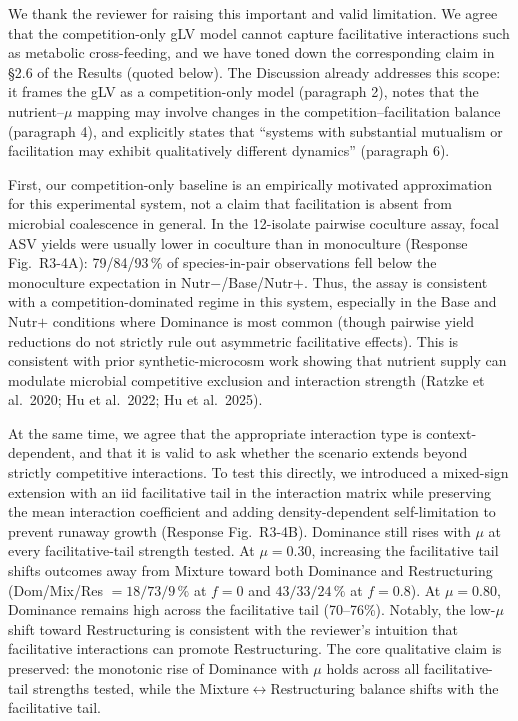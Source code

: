 \responselabel
We thank the reviewer for raising this important and valid limitation. We agree that the competition-only gLV model cannot capture facilitative interactions such as metabolic cross-feeding, and we have toned down the corresponding claim in \S2.6 of the Results (quoted below). The Discussion already addresses this scope: it frames the gLV as a competition-only model (paragraph 2), notes that the nutrient--$\mu$ mapping may involve changes in the competition--facilitation balance (paragraph 4), and explicitly states that ``systems with substantial mutualism or facilitation may exhibit qualitatively different dynamics'' (paragraph 6).

First, our competition-only baseline is an empirically motivated approximation for this experimental system, not a claim that facilitation is absent from microbial coalescence in general. In the 12-isolate pairwise coculture assay, focal ASV yields were usually lower in coculture than in monoculture (Response Fig.~R3-4A): 79/84/93\,\% of species-in-pair observations fell below the monoculture expectation in Nutr$-$/Base/Nutr$+$. Thus, the assay is consistent with a competition-dominated regime in this system, especially in the Base and Nutr$+$ conditions where Dominance is most common (though pairwise yield reductions do not strictly rule out asymmetric facilitative effects). This is consistent with prior synthetic-microcosm work showing that nutrient supply can modulate microbial competitive exclusion and interaction strength (Ratzke et al.\ 2020; Hu et al.\ 2022; Hu et al.\ 2025).

At the same time, we agree that the appropriate interaction type is context-dependent, and that it is valid to ask whether the scenario extends beyond strictly competitive interactions. To test this directly, we introduced a mixed-sign extension with an iid facilitative tail in the interaction matrix while preserving the mean interaction coefficient and adding density-dependent self-limitation to prevent runaway growth (Response Fig.~R3-4B). Dominance still rises with $\mu$ at every facilitative-tail strength tested. At $\mu=0.30$, increasing the facilitative tail shifts outcomes away from Mixture toward both Dominance and Restructuring (Dom/Mix/Res $=18/73/9\,\%$ at $f=0$ and $43/33/24\,\%$ at $f=0.8$). At $\mu=0.80$, Dominance remains high across the facilitative tail (70--76\%). Notably, the low-$\mu$ shift toward Restructuring is consistent with the reviewer's intuition that facilitative interactions can promote Restructuring. The core qualitative claim is preserved: the monotonic rise of Dominance with $\mu$ holds across all facilitative-tail strengths tested, while the Mixture$\leftrightarrow$Restructuring balance shifts with the facilitative tail.

